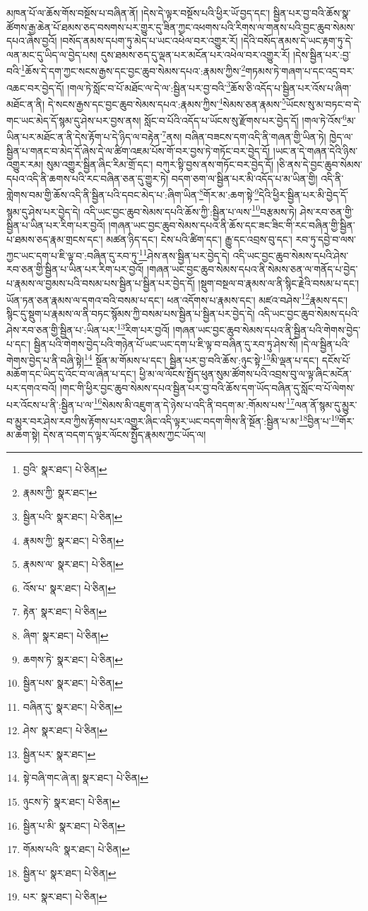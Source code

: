 མཁན་པོ་ལ་ཆོས་གོས་བསྔོས་པ་བཞིན་ནོ། །དེས་དེ་ལྟར་བསྔོས་པའི་ཕྱིར་ཡོ་བྱད་དང་། སྦྱིན་པར་བྱ་བའི་ཆོས་སྣ་ཚོགས་རྒྱ་ཆེན་པོ་ཐམས་ཅད་བསགས་པར་གྱུར་དུ་ཟིན་ཀྱང་འཕགས་པའི་རིགས་ལ་གནས་པའི་བྱང་ཆུབ་སེམས་དཔའ་ཞེས་བྱའོ། །བསོད་ནམས་དཔག་ཏུ་མེད་པ་ཡང་འཕེལ་བར་འགྱུར་རོ། །དེའི་བསོད་ནམས་དེ་ཡང་རྟག་ཏུ་དེ་ལན་མང་དུ་ཡིད་ལ་བྱེད་པས། དུས་ཐམས་ཅད་དུ་ལྡན་པར་མངོན་པར་འཕེལ་བར་འགྱུར་རོ། །དེས་སྦྱིན་པར་:བྱ་བའི་\footnote{བྱའི་  སྣར་ཐང་།  པེ་ཅིན། }ཆོས་དེ་དག་ཀྱང་སངས་རྒྱས་དང་བྱང་ཆུབ་སེམས་དཔའ་:རྣམས་ཀྱིས་\footnote{རྣམས་ཀྱི་  སྣར་ཐང་། }གཏམས་ཏེ་གཞག་པ་དང་འདྲ་བར་འཆང་བར་བྱེད་དོ། །གལ་ཏེ་སློང་བ་པོ་མཐོང་ལ་དེ་ལ་:སྦྱིན་པར་བྱ་བའི་\footnote{སྦྱིན་པའི་  སྣར་ཐང་།  པེ་ཅིན། }ཆོས་ཅི་འདོད་པ་སྦྱིན་པར་འོས་པ་ཞིག་མཐོང་ན་ནི། དེ་སངས་རྒྱས་དང་བྱང་ཆུབ་སེམས་དཔའ་:རྣམས་ཀྱིས་\footnote{རྣམས་ཀྱི་  སྣར་ཐང་།  པེ་ཅིན། }སེམས་ཅན་རྣམས་\footnote{རྣམས་ལ་  སྣར་ཐང་།  པེ་ཅིན། }ཡོངས་སུ་མ་བཏང་བ་དེ་གང་ཡང་མེད་དོ་སྙམ་དུ་ཤེས་པར་བྱས་ནས། སློང་བ་པོའི་འདོད་པ་ཡོངས་སུ་རྫོགས་པར་བྱེད་དོ། །གལ་ཏེ་འོས་\footnote{འོས་པ་  སྣར་ཐང་།  པེ་ཅིན། }མ་ཡིན་པར་མཐོང་ན་ནི་དེས་རྟོག་པ་དེ་ཉིད་ལ་བརྟེན་\footnote{རྟེན་  སྣར་ཐང་།  པེ་ཅིན། }ནས། བཞིན་བཟངས་དག་འདི་ནི་གཞན་གྱི་ཡིན་ཏེ། ཁྱེད་ལ་སྦྱིན་པ་གནང་བ་མེད་དོ་ཞེས་དེ་ལ་ཚིག་འཇམ་པོས་གོ་བར་བྱས་ཏེ་གཏོང་བར་བྱེད་དོ། །ཡང་ན་དེ་གཞན་དེའི་ཉིས་འགྱུར་རམ། སུམ་འགྱུར་སྦྱིན་ཞིང་རིམ་གྲོ་དང་། བཀུར་སྟི་བྱས་ནས་གཏོང་བར་བྱེད་དོ། །ཅི་ནས་དེ་བྱང་ཆུབ་སེམས་དཔའ་འདི་ནི་ཆགས་པའི་རང་བཞིན་ཅན་དུ་གྱུར་ཏེ། བདག་ཅག་ལ་སྦྱིན་པར་མི་འདོད་པ་མ་ཡིན་གྱི། འདི་ནི་གླེགས་བམ་གྱི་ཆོས་འདི་ནི་སྦྱིན་པའི་དབང་མེད་པ་:ཞིག་ཡིན་\footnote{ཞིག་  སྣར་ཐང་།  པེ་ཅིན། }གོར་མ་:ཆག་སྟེ་\footnote{ཆགས་ཏེ་  སྣར་ཐང་།  པེ་ཅིན། }དེའི་ཕྱིར་སྦྱིན་པར་མི་བྱེད་དོ་སྙམ་དུ་ཤེས་པར་བྱེད་དེ། འདི་ཡང་བྱང་ཆུབ་སེམས་དཔའི་ཆོས་ཀྱི་:སྦྱིན་པ་ལས་\footnote{སྦྱིན་པས་  སྣར་ཐང་།  པེ་ཅིན། }བརྩམས་ཏེ། ཤེས་རབ་ཅན་གྱི་སྦྱིན་པ་ཡིན་པར་རིག་པར་བྱའོ། །གཞན་ཡང་བྱང་ཆུབ་སེམས་དཔའ་ནི་ཆོས་དང་ཟང་ཟིང་གི་རང་བཞིན་གྱི་སྦྱིན་པ་ཐམས་ཅད་རྣམ་གྲངས་དང་། མཚན་ཉིད་དང་། ངེས་པའི་ཚིག་དང་། རྒྱུ་དང་འབྲས་བུ་དང་། རབ་ཏུ་དབྱེ་བ་ལས་ཀྱང་ཡང་དག་པ་ཇི་ལྟ་བ་:བཞིན་དུ་རབ་ཏུ་\footnote{བཞིན་དུ་  སྣར་ཐང་།  པེ་ཅིན། }ཤེས་ནས་སྦྱིན་པར་བྱེད་དེ། འདི་ཡང་བྱང་ཆུབ་སེམས་དཔའི་ཤེས་རབ་ཅན་གྱི་སྦྱིན་པ་ཡིན་པར་རིག་པར་བྱའོ། །གཞན་ཡང་བྱང་ཆུབ་སེམས་དཔའ་ནི་སེམས་ཅན་ལ་གནོད་པ་བྱེད་པ་རྣམས་ལ་བྱམས་པའི་བསམ་པས་སྦྱིན་པ་སྦྱིན་པར་བྱེད་དོ། །སྡུག་བསྔལ་བ་རྣམས་ལ་ནི་སྙིང་རྗེའི་བསམ་པ་དང་། ཡོན་ཏན་ཅན་རྣམས་ལ་དགའ་བའི་བསམ་པ་དང་། ཕན་འདོགས་པ་རྣམས་དང་། མཛའ་བཤེས་\footnote{ཤེས་  སྣར་ཐང་།  པེ་ཅིན། }རྣམས་དང་། སྙིང་དུ་སྡུག་པ་རྣམས་ལ་ནི་བཏང་སྙོམས་ཀྱི་བསམ་པས་སྦྱིན་པ་སྦྱིན་པར་བྱེད་དེ། འདི་ཡང་བྱང་ཆུབ་སེམས་དཔའི་ཤེས་རབ་ཅན་གྱི་སྦྱིན་པ་:ཡིན་པར་\footnote{སྦྱིན་པར་  སྣར་ཐང་། }རིག་པར་བྱའོ། །གཞན་ཡང་བྱང་ཆུབ་སེམས་དཔའ་ནི་སྦྱིན་པའི་གེགས་བྱེད་པ་དང་། སྦྱིན་པའི་གེགས་བྱེད་པའི་གཉེན་པོ་ཡང་ཡང་དག་པ་ཇི་ལྟ་བ་བཞིན་དུ་རབ་ཏུ་ཤེས་སོ། །དེ་ལ་སྦྱིན་པའི་གེགས་བྱེད་པ་ནི་བཞི་སྟེ།\footnote{སྟེ་བཞི་གང་ཞེ་ན།  སྣར་ཐང་།  པེ་ཅིན། } སྔོན་མ་གོམས་པ་དང་། སྦྱིན་པར་བྱ་བའི་ཆོས་:ཉུང་སྟེ་\footnote{ཉུངས་ཏེ་  སྣར་ཐང་།  པེ་ཅིན། }མི་ལྡན་པ་དང་། དངོས་པོ་མཆོག་དང་ཡིད་དུ་འོང་བ་ལ་ཞེན་པ་དང་། ཕྱི་མ་ལ་ལོངས་སྤྱོད་ཕུན་སུམ་ཚོགས་པའི་འབྲས་བུ་ལ་ལྟ་ཞིང་མངོན་པར་དགའ་བའོ། །གང་གི་ཕྱིར་བྱང་ཆུབ་སེམས་དཔའ་སྦྱིན་པར་བྱ་བའི་ཆོས་དག་ཡོད་བཞིན་དུ་སློང་བ་པོ་ལེགས་པར་འོངས་པ་ནི་:སྦྱིན་པ་ལ་\footnote{སྦྱིན་པ་མི་  སྣར་ཐང་།  པེ་ཅིན། }སེམས་མི་འཇུག་ན་དེ་ཉེས་པ་འདི་ནི་བདག་མ་:གོམས་པས་\footnote{གོམས་པའི་  སྣར་ཐང་།  པེ་ཅིན། }ལན་ནོ་སྙམ་དུ་མྱུར་བ་མྱུར་བར་ཤེས་རབ་ཀྱིས་རྟོགས་པར་འགྱུར་ཞིང་འདི་ལྟར་ཡང་བདག་གིས་ནི་སྔོན་:སྦྱིན་པ་མ་\footnote{སྦྱིན་པ་  སྣར་ཐང་།  པེ་ཅིན། }བྱིན་པ་\footnote{པར་  སྣར་ཐང་།  པེ་ཅིན། }གོར་མ་ཆག་སྟེ། དེས་ན་བདག་ད་ལྟར་ལོངས་སྤྱོད་རྣམས་ཀྱང་ཡོད་ལ། 